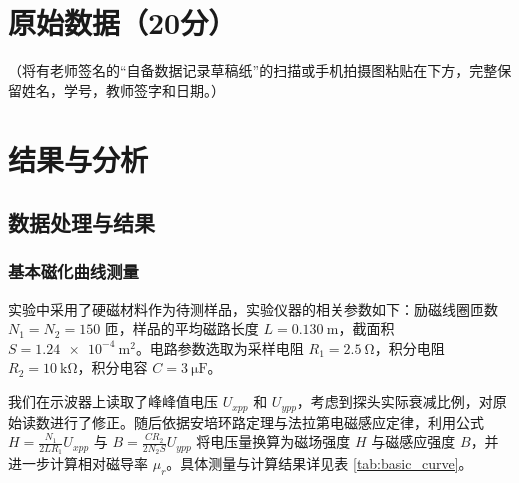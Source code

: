 \documentclass{../template/Report}%
\begin{document}
\begin{fullreportonly}
    \section{原始数据（20分）}
    （将有老师签名的“自备数据记录草稿纸”的扫描或手机拍摄图粘贴在下方，完整保留姓名，学号，教师签字和日期。）

    \section{结果与分析}

    \subsection{数据处理与结果}

    \subsubsection{基本磁化曲线测量}

    实验中采用了硬磁材料作为待测样品，实验仪器的相关参数如下：励磁线圈匝数 $N_1=N_2=150$ 匝，样品的平均磁路长度 $L=\SI{0.130}{\meter}$，截面积 $S=\SI{1.24e-4}{\meter\squared}$。电路参数选取为采样电阻 $R_1=\SI{2.5}{\ohm}$，积分电阻 $R_2=\SI{10}{\kilo\ohm}$，积分电容 $C=\SI{3}{\micro\farad}$。

    我们在示波器上读取了峰峰值电压 $U_{xpp}$ 和 $U_{ypp}$，考虑到探头实际衰减比例，对原始读数进行了修正。随后依据安培环路定理与法拉第电磁感应定律，利用公式 $H = \frac{N_1}{2 L R_1} U_{xpp}$ 与 $B = \frac{C R_2}{2 N_2 S} U_{ypp}$ 将电压量换算为磁场强度 $H$ 与磁感应强度 $B$，并进一步计算相对磁导率 $\mu_r$。具体测量与计算结果详见表 \ref{tab:basic_curve}。


\end{fullreportonly}
\end{document}
